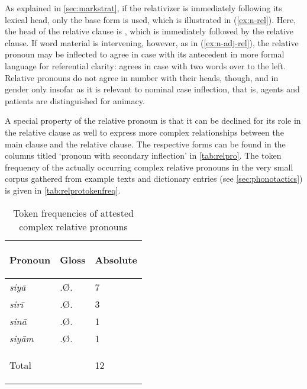 As explained in \autoref{sec:markstrat}, if the relativizer is immediately 
following its lexical head, only the base form  is used, which is 
illustrated in (\ref{ex:n-rel}). Here, the head of the relative clause is
, which is immediately followed by the
relative clause. If word material is intervening, however, as in
(\ref{ex:n-adj-rel}), the relative pronoun may be inflected to agree in case
with its antecedent in more formal language for referential clarity:
 agrees in case with  two words over to the
left. Relative pronouns do not agree in number with their heads, though, and in
gender only insofar as it is relevant to nominal case inflection, that is,
agents and patients are distinguished for animacy.

A special property of the relative pronoun is that it can be declined for its 
role in the relative clause as well to express more complex relationships 
between the main clause and the relative clause. The respective forms can be 
found in the columns titled `pronoun with secondary inflection' in 
\autoref{tab:relpro}. The token frequency of the actually occurring complex 
relative pronouns in the very small corpus gathered from example texts and 
dictionary entries (see \autoref{sec:phonotactics}) is given in 
\autoref{tab:relprotokenfreq}.

\begin{table}[tp]\centering
\caption{Token frequencies of attested complex relative pronouns}

\begin{tabu} to .75
\tableheaderfont\toprule

Pronoun & Gloss & Absolute \\

\toprule

siyā	& \Rel{}.Ø.\Loc{} & 7 \\
sirī	& \Rel{}.Ø.\Ins{} & 3 \\
sinā	& \Rel{}.Ø.\Gen{} & 1 \\
siyām	& \Rel{}.Ø.\Dat{} & 1 \\

\bottomrule

\textup{Total}	& & 12 \\

\bottomrule
\end{tabu}
\label{tab:relprotokenfreq}
\end{table}

